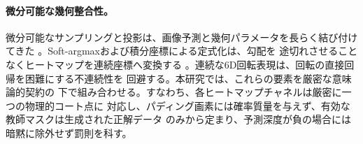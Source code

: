 \paragraph{微分可能な幾何整合性。}
微分可能なサンプリングと投影は、画像予測と幾何パラメータを長らく結び付けてきた
\citep{jaderberg2015spatial}。Soft-argmaxおよび積分座標による定式化は、勾配を
途切れさせることなくヒートマップを連続座標へ変換する
\citep{luvizon2019human}。連続な6D回転表現は、回転の直接回帰を困難にする不連続性を
回避する\citep{zhou2019continuity}。本研究では、これらの要素を厳密な意味論的契約の
下で組み合わせる。すなわち、各ヒートマップチャネルは厳密に一つの物理的コート点に
対応し、パディング画素には確率質量を与えず、有効な教師マスクは生成された正解データ
のみから定まり、予測深度が負の場合には暗黙に除外せず罰則を科す。
